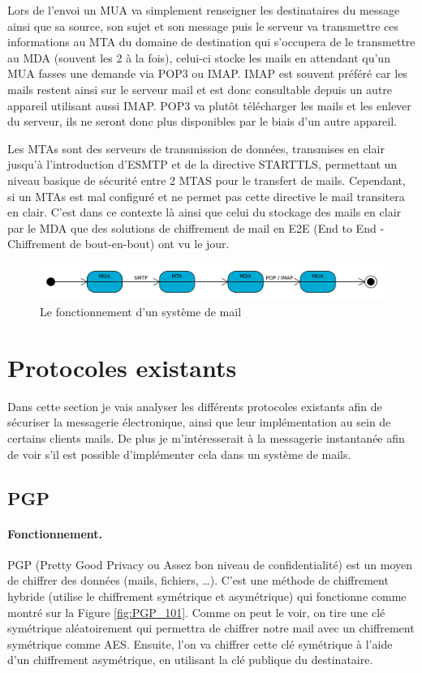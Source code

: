  Lors de l'envoi un MUA va simplement renseigner les destinataires du message ainsi que sa source, son sujet et son message puis le serveur va transmettre ces informations au MTA du domaine de destination qui s'occupera de le transmettre au MDA (souvent les 2 à la fois), celui-ci stocke les mails en attendant qu'un MUA fasses une demande via POP3 ou IMAP. IMAP est souvent préféré car les mails restent ainsi sur le serveur mail et est donc consultable depuis un autre appareil utilisant aussi IMAP. POP3 va plutôt télécharger les mails et les enlever du serveur, ils ne seront donc plus disponibles par le biais d'un autre appareil.
 
 Les MTAs sont des serveurs de transmission de données, transmises en clair jusqu'à l'introduction d'ESMTP et de la directive STARTTLS, permettant un niveau basique de sécurité entre 2 MTAS pour le transfert de mails. Cependant, si un MTAs est mal configuré et ne permet pas cette directive le mail transitera en clair. C'est dans ce contexte là ainsi que celui du stockage des mails en clair par le MDA que des solutions de chiffrement de mail en E2E (End to End - Chiffrement de bout-en-bout) ont vu le jour.
\begin{figure}[h!]
	\includegraphics[width=14cm]{images/Etapes_envoi_email.png}
	\centering
	\caption{Le fonctionnement d'un système de mail~\cite{wiki:mailGlobal}}
	\label{fig:mailGlobal}
\end{figure}
\section{Protocoles existants}
Dans cette section je vais analyser les différents protocoles existants afin de sécuriser la messagerie électronique, ainsi que leur implémentation au sein de certains clients mails. De plus je m'intéresserait à la messagerie instantanée afin de voir s'il est possible d'implémenter cela dans un système de mails.
\subsection{PGP}
\paragraph*{Fonctionnement.}
PGP (Pretty Good Privacy ou Assez bon niveau de confidentialité) est un moyen de chiffrer des données (mails, fichiers, …). C’est une méthode de chiffrement hybride (utilise le chiffrement symétrique et asymétrique) qui fonctionne comme montré sur la Figure \ref{fig:PGP_101}. Comme on peut le voir, on tire une clé symétrique aléatoirement qui permettra de chiffrer notre mail avec un chiffrement symétrique comme AES. Ensuite, l'on va chiffrer cette clé symétrique à l'aide d'un chiffrement asymétrique, en utilisant la clé publique du destinataire.

